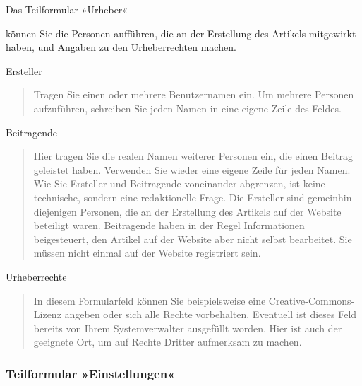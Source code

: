 \documentclass[a4paper,12pt,ngerman]{manual}
\begin{document}
Das Teilformular »Urheber«

können Sie die Personen aufführen, die an der Erstellung des Artikels
mitgewirkt haben, und Angaben zu den Urheberrechten machen.

Ersteller
\begin{quote}

Tragen Sie einen oder mehrere Benutzernamen ein. Um mehrere
Personen aufzuführen, schreiben Sie jeden Namen in eine eigene Zeile des
Feldes.
\end{quote}

Beitragende
\begin{quote}

Hier tragen Sie die realen Namen weiterer Personen ein, die
einen Beitrag geleistet haben. Verwenden Sie wieder eine eigene Zeile für
jeden Namen. Wie Sie Ersteller und Beitragende voneinander abgrenzen, ist
keine technische, sondern eine redaktionelle Frage. Die Ersteller sind
gemeinhin diejenigen Personen, die an der Erstellung des Artikels auf der
Website beteiligt waren. Beitragende haben in der Regel Informationen
beigesteuert, den Artikel auf der Website aber nicht selbst bearbeitet. Sie
müssen nicht einmal auf der Website registriert sein.
\end{quote}

Urheberrechte
\begin{quote}

In diesem Formularfeld können Sie beispielsweise eine
Creative-Commons-Lizenz angeben oder sich alle Rechte
vorbehalten. Eventuell ist dieses Feld bereits von Ihrem
Systemverwalter ausgefüllt worden. Hier ist auch der geeignete Ort,
um auf Rechte Dritter aufmerksam zu machen.
\end{quote}
\hypertarget{sec-teilf-einst}{}

\subsubsection{Teilformular »Einstellungen«}
\end{document}
